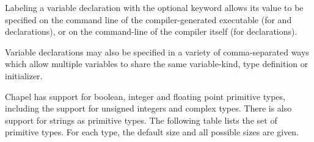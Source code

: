 Labeling a variable declaration with the optional 
keyword allows its value to be specified on the command line of the
compiler-generated executable (for  and
 declarations), or on the command-line of the
compiler itself (for  declarations).

Variable declarations may also be specified in a variety of
comma-separated ways which allow multiple variables to share the same
variable-kind, type definition or initializer.  

Chapel has support for boolean, integer and floating point primitive types,
including the support for unsigned integers and complex types.  There is
also support for strings as primitive types.  The following table
lists the set of primitive types.  For each type, the default size and
all possible sizes are given.

